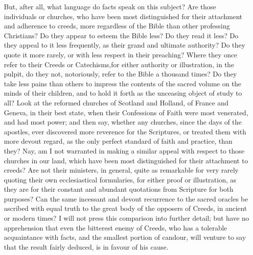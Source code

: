 \documentclass[
]{book}
\begin{document}
But, after all, what language do facts speak on this subject? Are those individuals or churches, who have been most distinguished for their attachment and adherence to creeds, more regardless of the Bible than other professing Christians? Do they appear to esteem the Bible less? Do they read it less? Do they appeal to it less frequently, as their grand and ultimate authority? Do they quote it more rarely, or with less respect in their preaching? Where they once refer to their Creeds or Catechisms,for either authority or illustration, in the pulpit, do they not, notoriously, refer to the Bible a thousand times? Do they take less pains than others to impress the contents of the sacred volume on the minds of their children, and to hold it forth as the unceasing object of study to all? Look at the reformed churches of Scotland and Holland, of France and Geneva, in their best state, when their Confessions of Faith were most venerated, and had most power; and then say, whether any churches, since the days of the apostles, ever discovered more reverence for the Scriptures, or treated them with more devout regard, as the only perfect standard of faith and practice, than they? Nay, am I not warranted in making a similar appeal with respect to those churches in our land, which have been most distinguished for their attachment to creeds? Are not their ministers, in general, quite as remarkable for very rarely quoting their own ecclesiastical formularies, for either proof or illustration, as they are for their constant and abundant quotations from Scripture for both purposes? Can the same incessant and devout recurrence to the sacred oracles be ascribed with equal truth to the great body of the opposers of Creeds, in ancient or modern times? I will not press this comparison into further detail; but have no apprehension that even the bitterest enemy of Creeds, who has a tolerable acquaintance with facts, and the smallest portion of candour, will venture to say that the result fairly deduced, is in favour of his cause.
\end{document}
